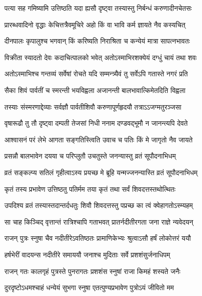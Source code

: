 \twolineshloka
{पत्या सह गमिष्यामि उत्तिष्ठति यदा ह्यसौ}
{दृष्ट्वा तस्यास्तु निर्बन्धं करुणादीनचेतसः} %

\twolineshloka
{प्रारब्धवादिनो वृद्धाः केचित्तत्रैवमूचिरे}
{अहो किं वा भावि कर्म ज्ञायते नैव कस्यचित्} %

\twolineshloka
{दीनपालः कृपालुश्च भगवान् किं करिष्यति}
{निराश्रिता च कन्येयं मात्रा सापत्नभावतः} %

\twolineshloka
{विक्रीता स्यादतो देवः कदाचित्पालको भवेत्}
{अतोऽस्माभिरशक्येयं दग्धुं चायं तथा शवः} %

\twolineshloka
{अतोऽस्माभिश्च गन्तव्यं सर्वेषां रोचते यदि}
{सम्मन्त्र्यैवं तु सर्वेऽपि गतास्ते नगरं प्रति} %

\twolineshloka
{सैका शिवं पार्वतीं च स्मरन्ती भयविह्वला}
{अजानन्ती बालभावात्किमेतदिति विह्वला} %

\twolineshloka
{तस्याः संस्मरणाद्देव्याः सर्वज्ञौ पार्वतीशिवौ}
{करुणापूर्णहृदयौ तत्राऽऽजग्मतुरञ्जसा} %

\twolineshloka
{वृषारूढौ तु तौ दृष्ट्वा दम्पती तेजसां निधी}
{ननाम दण्डवद्भूमौ न जानन्त्यपि देवते} %

\twolineshloka
{आश्वासनं परं लेभे आगता सङ्गतिस्त्विति}
{उवाच च पतिः किं मे जागृतो नैव जायते} %

\twolineshloka
{प्रसन्नौ बालभावेन दयया च परिप्लुतौ}
{उचतुस्ते जनन्यास्तु व्रतं सूपौदनाभिधम्} %

\twolineshloka
{व्रतं सङ्कल्प्य सतिलं गृहीत्वाऽस्य प्रयच्छ मे}
{ब्रूहि यन्मज्जनन्यास्ति व्रतं सूपौदनाभिधम्} %

\twolineshloka
{कृतं तस्य प्रभावेण उत्तिष्ठतु पतिर्मम}
{तया कृतं तथा सर्वं शिवदत्तस्तथोत्थितः} %

\twolineshloka
{उपदिश्य व्रतं तस्यास्तदान्तर्दधतुः शिवौ}
{शिवदत्तस्तु पप्रच्छ का त्वं क्वेहागतोऽस्म्यहम्} %

\twolineshloka
{सा चाह किञ्चिद् वृत्तान्तं रात्रिश्चापि गताभवत्}
{प्रातर्नदीतीरगता जना राज्ञे न्यवेदयन्} %

\twolineshloka
{राजन् पुत्रः स्नुषा चैव नदीतीरेऽवतिष्ठतः}
{प्रामाणिकेभ्यः श्रुत्वाऽसौ हर्षं लोकोत्तरं ययौ} %

\twolineshloka
{हर्षभेरीं वादयन्स नदीतीरे समाययौ}
{जनाश्च मुदिताः सर्वे प्रशशंसुर्जनाधिपम्} %

\twolineshloka
{राजन् गतः कालगृहं पुत्रस्ते पुनरागतः}
{प्रशशंस स्नुषां राजा किमहं शस्यते जनैः} %

\twolineshloka
{दुरदृष्टोऽधमश्चाहं धन्येयं सुभगा स्नुषा}
{एतत्पुण्यप्रभावेण पुत्रोऽयं जीवितो मम} %

